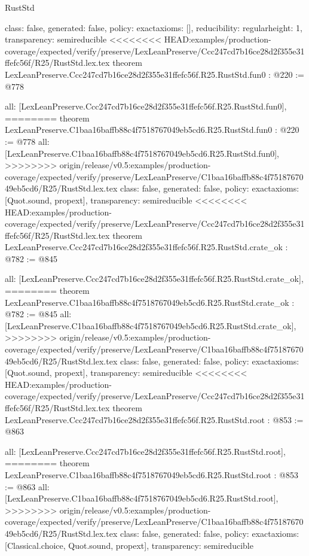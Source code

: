 \begin{lexlean}{RustStd}
\begin{coremodule}
{\begin{coremodule}
{{{  class: false,
  generated: false,
  policy: exact{axioms: []},
  reducibility: regular{height: 1},
  transparency: semireducible
}
<<<<<<<< HEAD:examples/production-coverage/expected/verify/preserve/LexLeanPreserve/Ccc247cd7b16ce28d2f355e31ffefc56f/R25/RustStd.lex.tex
theorem LexLeanPreserve.Ccc247cd7b16ce28d2f355e31ffefc56f.R25.RustStd.fun0 : @220 := @778 {
  all: [LexLeanPreserve.Ccc247cd7b16ce28d2f355e31ffefc56f.R25.RustStd.fun0],
========
theorem LexLeanPreserve.C1baa16baffb88c4f7518767049eb5cd6.R25.RustStd.fun0 : @220 := @778 {
  all: [LexLeanPreserve.C1baa16baffb88c4f7518767049eb5cd6.R25.RustStd.fun0],
>>>>>>>> origin/release/v0.5:examples/production-coverage/expected/verify/preserve/LexLeanPreserve/C1baa16baffb88c4f7518767049eb5cd6/R25/RustStd.lex.tex
  class: false,
  generated: false,
  policy: exact{axioms: [Quot.sound, propext]},
  transparency: semireducible
}
<<<<<<<< HEAD:examples/production-coverage/expected/verify/preserve/LexLeanPreserve/Ccc247cd7b16ce28d2f355e31ffefc56f/R25/RustStd.lex.tex
theorem LexLeanPreserve.Ccc247cd7b16ce28d2f355e31ffefc56f.R25.RustStd.crate_ok : @782 := @845 {
  all: [LexLeanPreserve.Ccc247cd7b16ce28d2f355e31ffefc56f.R25.RustStd.crate_ok],
========
theorem LexLeanPreserve.C1baa16baffb88c4f7518767049eb5cd6.R25.RustStd.crate_ok : @782 := @845 {
  all: [LexLeanPreserve.C1baa16baffb88c4f7518767049eb5cd6.R25.RustStd.crate_ok],
>>>>>>>> origin/release/v0.5:examples/production-coverage/expected/verify/preserve/LexLeanPreserve/C1baa16baffb88c4f7518767049eb5cd6/R25/RustStd.lex.tex
  class: false,
  generated: false,
  policy: exact{axioms: [Quot.sound, propext]},
  transparency: semireducible
}
<<<<<<<< HEAD:examples/production-coverage/expected/verify/preserve/LexLeanPreserve/Ccc247cd7b16ce28d2f355e31ffefc56f/R25/RustStd.lex.tex
theorem LexLeanPreserve.Ccc247cd7b16ce28d2f355e31ffefc56f.R25.RustStd.root : @853 := @863 {
  all: [LexLeanPreserve.Ccc247cd7b16ce28d2f355e31ffefc56f.R25.RustStd.root],
========
theorem LexLeanPreserve.C1baa16baffb88c4f7518767049eb5cd6.R25.RustStd.root : @853 := @863 {
  all: [LexLeanPreserve.C1baa16baffb88c4f7518767049eb5cd6.R25.RustStd.root],
>>>>>>>> origin/release/v0.5:examples/production-coverage/expected/verify/preserve/LexLeanPreserve/C1baa16baffb88c4f7518767049eb5cd6/R25/RustStd.lex.tex
  class: false,
  generated: false,
  policy: exact{axioms: [Classical.choice, Quot.sound, propext]},
  transparency: semireducible
}

}}}}}
\end{coremodule}}
\end{coremodule}
\end{lexlean}
